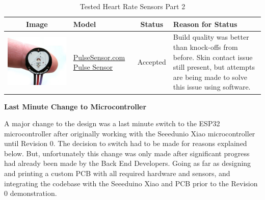 \documentclass[12pt, titlepage]{article}
\begin{document}
\begin{table}[H]
  \label{HRSensors_Pt2}\caption{Tested Heart Rate Sensors Part 2}
  \begin{tabular}{ | c | m{3cm} | c | m{7cm} |}
    \hline
    \textbf{Image}                              & \textbf{Model}                                                                                                                                                    & \textbf{Status} & \textbf{Reason for Status}                                                                                                                                                                                                                                               \\
    \hline
    \includegraphics[scale = 0.25]{pulseSensor} & \href{https://pulsesensor.com/}{PulseSensor.com Pulse Sensor}                                                                                                     & Accepted        & Build quality was better than knock-offs from before. Skin contact issue still present, but attempts are being made to solve this issue using software.                                                                                                                  \\
    \hline
  \end{tabular}
\end{table}

\textbf{Last Minute Change to Microcontroller}

A major change to the design was a last minute switch to the ESP32 microcontroller after originally working with the Seeedunio Xiao microcontroller until Revision 0. The decision to switch had to be made for reasons explained below. But, unfortunately this change was only made after significant progress had already been made by the Back End Developers. Going as far as designing and printing a custom PCB with all required hardware and sensors, and integrating the codebase with the Seeeduino Xiao and PCB prior to the Revision 0 demonstration. \\
\end{document}
